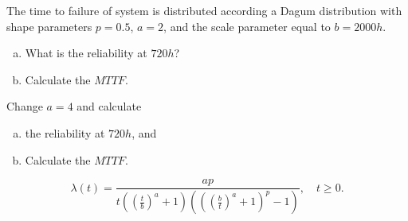 \documentclass{article}
\begin{document}
\begin{question}
    The time to failure of system is distributed according a Dagum distribution with shape parameters \( p = 0.5 \), \( a = 2 \), and the scale parameter equal to \( b = 2000h \). 
    \begin{enumerate}[(a)]
        \item What is the reliability at \( 720h \)?
        \item Calculate the \( MTTF \). 
    \end{enumerate}
    Change \( a = 4 \) and calculate 
    \begin{enumerate}[(c)]
            \item the reliability at \( 720h \), and 
            \item Calculate the \( MTTF \).
    \end{enumerate}
    
    \[ \lambda(t) = \frac{ap}{t \left( \left( \frac{t}{b} \right)^a + 1 \right) \left( \left( \left( \frac{b}{t} \right)^a + 1 \right)^p - 1 \right)}, \quad t \geq 0. \]
\end{question}
\end{document}
